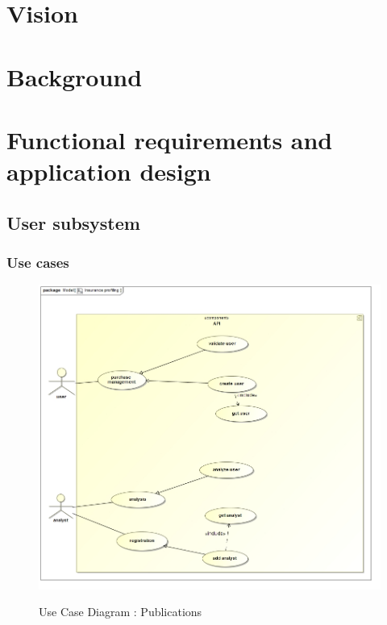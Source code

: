 \documentclass{article}
\begin{document}
\section{Vision}
\section{Background}

\section{Functional requirements and application design}
	\subsection{User subsystem}
		\subsubsection{Use cases}

		\begin{figure}[H]
		\includegraphics[width=\textwidth]{images/uc__Insurance_profiling.jpg}  \\
		\caption{Use Case Diagram : Publications}
		\end{figure}
\end{document}
